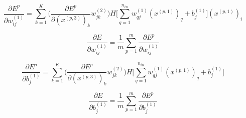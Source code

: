 \documentclass[a4paper,11pt,oneside,roman]{article}
\begin{document}
    \begin{equation}
        \nonumber
        \frac{\partial E^p}{\partial w_{ij}^{(1)}} = \sum\limits_{k=1}^{K} \Big(\frac{\partial E^p}{\partial (x^{(p,3)})_k} w_{jk}^{(2)}\Big) H\big[\sum\limits_{q=1}^{n_{in}} w_{qj}^{(1)}(x^{(p,1)})_{q} + b_j^{(1)}\big] (x^{(p,1)})_i
    \end{equation}

    \begin{equation}
        \nonumber
        \frac{\partial E}{\partial w_{ij}^{(1)}} = \frac{1}{m}\sum\limits_{p=1}^{m}\frac{\partial E^p}{\partial w_{ij}^{(1)}}
    \end{equation}

    \begin{equation}
        \nonumber
        \frac{\partial E^p}{\partial b_j^{(1)}} = \sum\limits_{k=1}^{K} \Big(\frac{\partial E^p}{\partial (x^{(p,3)})_k} w_{jk}^{(2)}\Big) H\big[\sum\limits_{q=1}^{n_{in}} w_{qj}^{(1)}(x^{(p,1)})_{q} + b_j^{(1)}\big]
    \end{equation}

    \begin{equation}
        \nonumber
        \frac{\partial E}{\partial b_j^{(1)}} = \frac{1}{m}\sum\limits_{p=1}^{m}\frac{\partial E^p}{\partial b_j^{(1)}}
    \end{equation}
\end{document}
